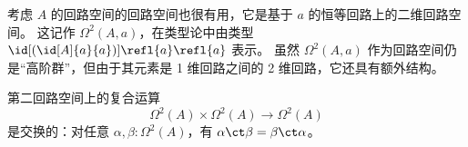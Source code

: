考虑 $A$ 的回路空间的回路空间也很有用，它是基于 $a$ 的恒等回路上的二维回路空间。
这记作 $\Omega^2(A,a)$，在类型论中由类型 $\id[({\id[A]{a}{a}})]{\refl{a}}{\refl{a}}$ 表示。
虽然 $\Omega^2(A,a)$ 作为回路空间仍是“高阶群”，但由于其元素是 1 维回路之间的 2 维回路，它还具有额外结构。

\begin{thm}\label{thm:EckmannHilton}
  第二回路空间上的复合运算
  \begin{equation*}
    \Omega^2(A)\times \Omega^2(A)\to \Omega^2(A)
  \end{equation*}
  是交换的：对任意 $\alpha, \beta:\Omega^2(A)$，有 $\alpha\ct\beta = \beta\ct\alpha$。
\end{thm}

